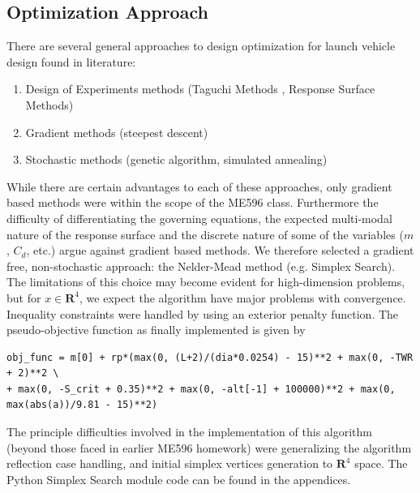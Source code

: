 \documentclass[]{aiaa-tc}%
\begin{document}
\subsection{Optimization Approach}
There are several general approaches to design optimization for launch vehicle design found in literature:
\begin{enumerate}
\item Design of Experiments methods (Taguchi Methods\cite{Taguchi} \hspace{0.1 mm}, Response Surface Methods\cite{RSM})
\item Gradient methods (steepest descent)
\item Stochastic methods (genetic algorithm\cite{genetic}, simulated annealing)
\end{enumerate}
While there are certain advantages to each of these approaches, only gradient based methods were within the scope of the ME596 class. Furthermore the difficulty of differentiating the governing equations, the expected multi-modal nature of the response surface and the discrete nature of some of the variables ($m$, $C_d$, etc.) argue against gradient based methods. We therefore selected a gradient free, non-stochastic approach: the Nelder-Mead method (e.g. Simplex Search). The limitations of this choice may become evident for high-dimension problems, but for $x \in \textbf{R}^4$, we expect the algorithm have major problems with convergence. Inequality constraints were handled by using an exterior penalty function. The pseudo-objective function as finally implemented is given by
\begin{verbatim}
obj_func = m[0] + rp*(max(0, (L+2)/(dia*0.0254) - 15)**2 + max(0, -TWR + 2)**2 \
+ max(0, -S_crit + 0.35)**2 + max(0, -alt[-1] + 100000)**2 + max(0, max(abs(a))/9.81 - 15)**2)
\end{verbatim}

The principle difficulties involved in the implementation of this algorithm (beyond those faced in earlier ME596 homework) were generalizing the algorithm reflection case handling, and initial simplex vertices generation to $\textbf{R}^4$ space. The Python Simplex Search module code can be found in the appendices.
\end{document}
